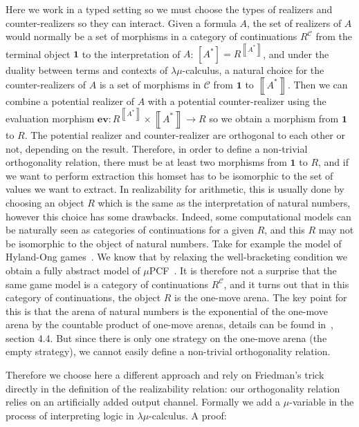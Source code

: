 \documentclass{CSML}
\newcommand*\LogFormA{A}
\newcommand*\LmInterpForm[1]{{#1}^*}
\newcommand*\CatC{\mathcal{C}}
\newcommand*\CatR{R}
\newcommand*\CatRC{\CatExp{\CatR}{\CatC}}
\newcommand*\CatTimes\times
\newcommand*\CatExp[2]{#1^{#2}}
\newcommand*\CatEval{\mathbf{ev}}
\newcommand*\CatTerm{\mathbf{1}}
\newcommand*\CatInterpSortNeg[1]{{\left\llbracket#1\right\rrbracket}}
\newcommand*\CatInterpSort[1]{{\left[#1\right]}}
\begin{document}
Here we work in a typed setting so we must choose the types of realizers and counter-realizers so they can interact. Given a formula $\LogFormA$, the set of realizers of $\LogFormA$ would normally be a set of morphisms in a category of continuations $\CatRC$ from the terminal object $\CatTerm$ to the interpretation of $\LogFormA$: $\CatInterpSort{\LmInterpForm{\LogFormA}}=\CatExp{\CatR}{\CatInterpSortNeg{\LmInterpForm{\LogFormA}}}$, and under the duality between terms and contexts of $\lambda\mu$-calculus, a natural choice for the counter-realizers of $\LogFormA$ is a set of morphisms in $\CatC$ from $\CatTerm$ to $\CatInterpSortNeg{\LmInterpForm{\LogFormA}}$. Then we can combine a potential realizer of $\LogFormA$ with a potential counter-realizer using the evaluation morphism $\CatEval:\CatExp{\CatR}{\CatInterpSortNeg{\LmInterpForm{\LogFormA}}}\CatTimes\CatInterpSortNeg{\LmInterpForm{\LogFormA}}\to\CatR$ so we obtain a morphism from $\CatTerm$ to $\CatR$. The potential realizer and counter-realizer are orthogonal to each other or not, depending on the result. Therefore, in order to define a non-trivial orthogonality relation, there must be at least two morphisms from $\CatTerm$ to $\CatR$, and if we want to perform extraction this homset has to be isomorphic to the set of values we want to extract. In realizability for arithmetic, this is usually done by choosing an object $\CatR$ which is the same as the interpretation of natural numbers, however this choice has some drawbacks. Indeed, some computational models can be naturally seen as categories of continuations for a given $\CatR$, and this $\CatR$ may not be isomorphic to the object of natural numbers. Take for example the model of Hyland-Ong games~\cite{HO}. We know that by relaxing the well-bracketing condition we obtain a fully abstract model of $\mu$PCF~\cite{LairdControl}. It is therefore not a surprise that the same game model is a category of continuations $\CatRC$, and it turns out that in this category of continuations, the object $\CatR$ is the one-move arena. The key point for this is that the arena of natural numbers is the exponential of the one-move arena by the countable product of one-move arenas, details can be found in~\cite{BlotThesis}, section 4.4. But since there is only one strategy on the one-move arena (the empty strategy), we cannot easily define a non-trivial orthogonality relation.\par
Therefore we choose here a different approach and rely on Friedman's trick directly in the definition of the realizability relation: our orthogonality relation relies on an artificially added output channel. Formally we add a $\mu$-variable in the process of interpreting logic in $\lambda\mu$-calculus. A proof:
\end{document}
